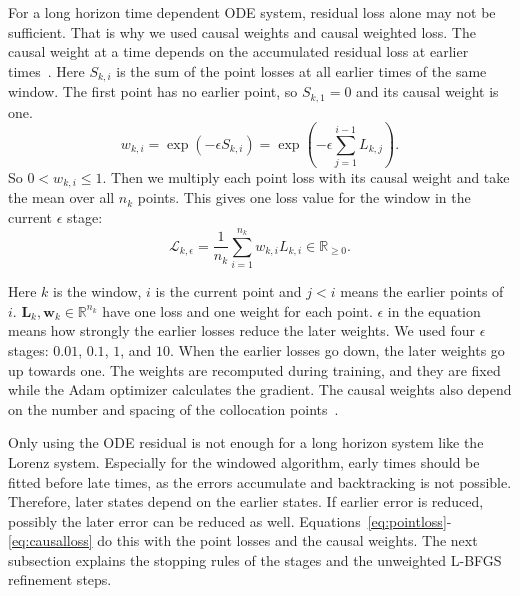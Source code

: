 \documentclass[conference,a4paper]{IEEEtran}
\begin{document}
For a long horizon time dependent ODE system, residual loss alone may not be sufficient. That is why we used causal weights and causal weighted loss. The causal weight at a time depends on the accumulated residual loss at earlier times~\cite{wang2024causal}. Here $S_{k,i}$ is the sum of the point losses at all earlier times of the same window. The first point has no earlier point, so $S_{k,1}=0$ and its causal weight is one.
\begin{equation}
w_{k,i}
=\exp\left(-\epsilon S_{k,i}\right)
=\exp\left(-\epsilon\sum_{j=1}^{i-1}L_{k,j}\right).
\label{eq:weights}
\end{equation}
So $0<w_{k,i}\leq1$. Then we multiply each point loss with its causal weight and take the mean over all $n_k$ points. This gives one loss value for the window in the current $\epsilon$ stage:
\begin{equation}
\mathcal{L}_{k,\epsilon}
=\frac{1}{n_k}
 \sum_{i=1}^{n_k}w_{k,i}L_{k,i}
\in\mathbb{R}_{\geq0}.
\label{eq:causalloss}
\end{equation}

Here $k$ is the window, $i$ is the current point and $j<i$ means the earlier points of $i$. $\mathbf{L}_k,\mathbf{w}_k\in\mathbb{R}^{n_k}$ have one loss and one weight for each point. $\epsilon$ in the equation means how strongly the earlier losses reduce the later weights. We used four $\epsilon$ stages: $0.01$, $0.1$, $1$, and $10$. When the earlier losses go down, the later weights go up towards one. The weights are recomputed during training, and they are fixed while the Adam optimizer calculates the gradient. The causal weights also depend on the number and spacing of the collocation points~\cite{wang2024causal}.

Only using the ODE residual is not enough for a long horizon system like the Lorenz system. Especially for the windowed algorithm, early times should be fitted before late times, as the errors accumulate and backtracking is not possible. Therefore, later states depend on the earlier states. If earlier error is reduced, possibly the later error can be reduced as well. Equations~\eqref{eq:pointloss}-\eqref{eq:causalloss} do this with the point losses and the causal weights. The next subsection explains the stopping rules of the stages and the unweighted L-BFGS refinement steps.
\end{document}

